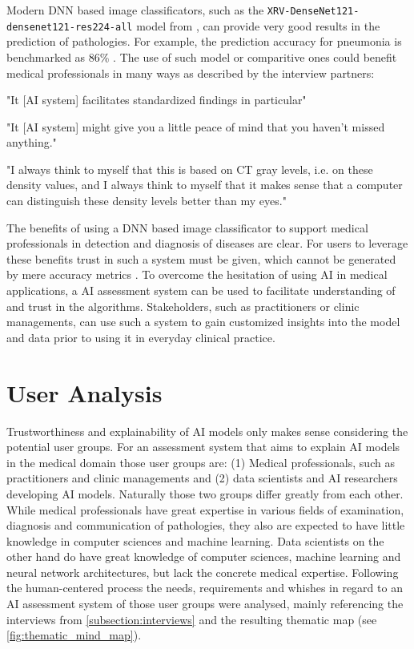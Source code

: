 \documentclass[11pt,a4paper,english]{scrreprt}
\begin{document}
Modern DNN based image classificators, such as the \texttt{XRV\--DenseNet121\--densenet121\--res224\--all} model from \textcite{cohen_limits_2020}, can provide very good results in the prediction of pathologies. For example, the prediction accuracy for pneumonia is benchmarked as 86\% \parencite{torchxrayvision_github}. The use of such model or comparitive ones could benefit medical professionals in many ways as described by the interview partners:
\begin{displayquote}
    "It [AI system] facilitates standardized findings in particular"
\end{displayquote}
\begin{displayquote}
    "It [AI system] might give you a little peace of mind that you haven't missed anything."
\end{displayquote}
\begin{displayquote}
    "I always think to myself that this is based on CT gray levels, i.e. on these density values, and I always think to myself that it makes sense that a computer can distinguish these density levels better than my eyes."
\end{displayquote}

The benefits of using a DNN based image classificator to support medical professionals in detection and diagnosis of diseases are clear. For users to leverage these benefits trust in such a system must be given, which cannot be generated by mere accuracy metrics \parencite{samek_explaining_2021}. To overcome the hesitation of using AI in medical applications, a AI assessment system can be used to facilitate understanding of and trust in the algorithms. Stakeholders, such as practitioners or clinic managements, can use such a system to gain customized insights into the model and data prior to using it in everyday clinical practice.

\section{User Analysis}
Trustworthiness and explainability of AI models only makes sense considering the potential user groups. For an assessment system that aims to explain AI models in the medical domain those user groups are: (1) Medical professionals, such as practitioners and clinic managements and (2) data scientists and AI researchers developing AI models. Naturally those two groups differ greatly from each other. While medical professionals have great expertise in various fields of examination, diagnosis and communication of pathologies, they also are expected to have little knowledge in computer sciences and machine learning. Data scientists on the other hand do have great knowledge of computer sciences, machine learning and neural network architectures, but lack the concrete medical expertise. Following the human-centered process the needs, requirements and whishes in regard to an AI assessment system of those user groups were analysed, mainly referencing the interviews from \autoref{subsection:interviews} and the resulting thematic map (see \autoref{fig:thematic_mind_map}).
\end{document}
